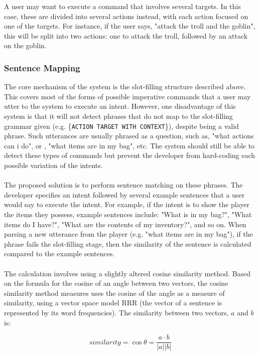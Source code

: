 \documentclass[11pt]{article}
\begin{document}
A user may want to execute a command that involves several targets. In this case, these are divided into several actions instead, with each action focused on one of the targets. For instance, if the user says, "attack the troll and the goblin", this will be split into two actions: one to attack the troll, followed by an attack on the goblin.

\subsubsection{Sentence Mapping}
\label{section:sentence-mapping}

The core mechanism of the system is the slot-filling structure described above. This covers most of the forms of possible imperative commands that a user may utter to the system to execute an intent. However, one disadvantage of this system is that it will not detect phrases that do not map to the slot-filling grammar given (e.g. \{\texttt{ACTION TARGET WITH CONTEXT}\}), despite being a valid phrase. Such utterances are usually phrased as a question, such as, "what actions can i do", or , "what items are in my bag", etc. The system should still be able to detect these types of commands but prevent the developer from hard-coding each possible variation of the intents.
\\
\\
The proposed solution is to perform sentence matching on these phrases. The developer specifies an intent followed by several example sentences that a user would say to execute the intent. For example, if the intent is to show the player the items they possess, example sentences include: "What is in my bag?", "What items do I have?", "What are the contents of my inventory?", and so on. When parsing a new utterance from the player (e.g. "what items are in my bag"), if the phrase fails the slot-filling stage, then the similarity of the sentence is calculated compared to the example sentences.
\\
\\
The calculation involves using a slightly altered cosine similarity method. Based on the formula for the cosine of an angle between two vectors, the cosine  similarity method measures uses the cosine of the angle as a measure of similarity, using a vector space model RRR (the vector of a sentence is represented by its word frequencies). The similarity between two vectors, $a$ and $b$ is:

$$similarity = \cos \theta = \frac{a \cdot b}{\lvert a\rvert\lvert b\rvert}$$
\end{document}
